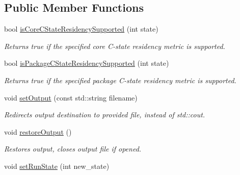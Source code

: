 \subsection*{Public Member Functions}
\begin{DoxyCompactItemize}
\item 
\mbox{\label{class_p_c_m_af43f3a1e920264467a3855ced5f8162b}} 
bool \mbox{\hyperlink{class_p_c_m_af43f3a1e920264467a3855ced5f8162b}{is\+Core\+C\+State\+Residency\+Supported}} (int state)
\begin{DoxyCompactList}\small\item\em Returns true if the specified core C-\/state residency metric is supported. \end{DoxyCompactList}\item 
\mbox{\label{class_p_c_m_aad05d8a2f383ad41d25892175373b613}} 
bool \mbox{\hyperlink{class_p_c_m_aad05d8a2f383ad41d25892175373b613}{is\+Package\+C\+State\+Residency\+Supported}} (int state)
\begin{DoxyCompactList}\small\item\em Returns true if the specified package C-\/state residency metric is supported. \end{DoxyCompactList}\item 
\mbox{\label{class_p_c_m_aaab4b857581f55723fc3959cf6c8cd91}} 
void \mbox{\hyperlink{class_p_c_m_aaab4b857581f55723fc3959cf6c8cd91}{set\+Output}} (const std\+::string filename)
\begin{DoxyCompactList}\small\item\em Redirects output destination to provided file, instead of std\+::cout. \end{DoxyCompactList}\item 
\mbox{\label{class_p_c_m_af8bcd9d89ee64d8effdf968132f3b842}} 
void \mbox{\hyperlink{class_p_c_m_af8bcd9d89ee64d8effdf968132f3b842}{restore\+Output}} ()
\begin{DoxyCompactList}\small\item\em Restores output, closes output file if opened. \end{DoxyCompactList}\item 
\mbox{\label{class_p_c_m_adb5b4989751f87a17649810a964fa053}} 
void \mbox{\hyperlink{class_p_c_m_adb5b4989751f87a17649810a964fa053}{set\+Run\+State}} (int new\+\_\+state)

\end{DoxyCompactItemize}
